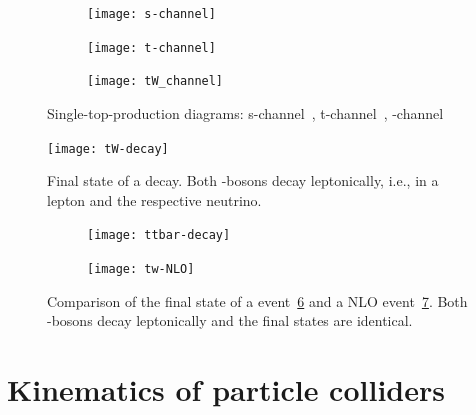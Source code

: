 \begin{figure}[htbp]
  \begin{subfigure}[b]{0.3\textwidth}
  	\centering
    \texttt{[image: s-channel]}
    \caption{}
    \label{fig:singletop:virtualWt}
  \end{subfigure}
  \quad
  \begin{subfigure}[b]{0.3\textwidth}
  	\centering
    \texttt{[image: t-channel]}
    \caption{}
    \label{fig:singletop:virtualWs}
  \end{subfigure}
  \quad
  \begin{subfigure}[b]{0.3\textwidth}
  	\centering
    \texttt{[image: tW\_channel]}
    \caption{}
	\label{fig:singletop:tW}
  \end{subfigure} 
  \caption[Single-top-production diagrams]{Single-top-production diagrams: s-channel~, t-channel~, \tW-channel~}
  \label{fig:singletop}
\end{figure}


\begin{figure}[htbp]
	\centering
	\texttt{[image: tW-decay]}
	\caption[Final state of a \tW decay]{Final state of a \tW decay. Both \PW-bosons decay leptonically, {i.e.}, in a lepton and the respective neutrino.}
	\label{fig:tw-decay}
\end{figure}

\begin{figure}[htbp]
    \centering
    \begin{subfigure}[b]{0.44\textwidth}
        \texttt{[image: ttbar-decay]}
        \caption{}
        \label{fig:nlo:ttbar}
    \end{subfigure}
\quad
    \begin{subfigure}[b]{0.44\textwidth}
        \texttt{[image: tw-NLO]}
        \caption{}
        \label{fig:nlo:tw}
    \end{subfigure}
    \caption[Comparison of the final state of a \ttbar and \tW event]{Comparison of the final state of a \ttbar event~\ref{fig:nlo:ttbar} and a NLO \tW event~\ref{fig:nlo:tw}. Both \PW-bosons decay leptonically and the final states are identical.}
	\label{fig:nlo}
\end{figure}



\section{Kinematics of particle colliders}


